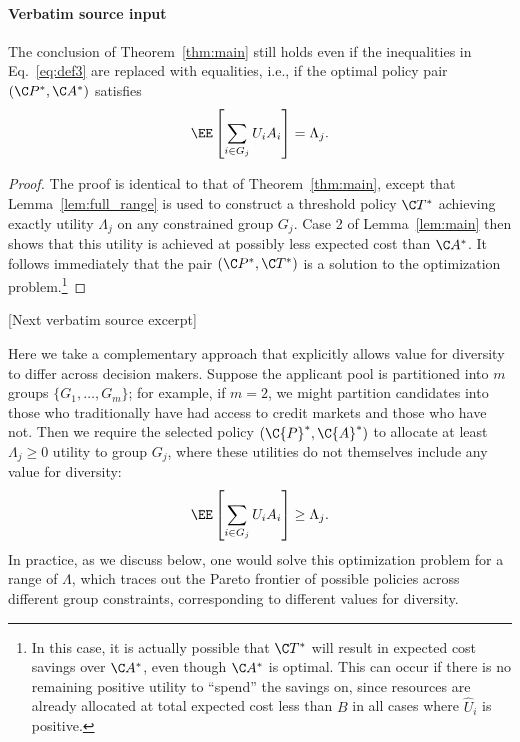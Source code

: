 \documentclass[10pt]{article}
\begin{document}
\paragraph{Verbatim source input}
\begin{ReviewVerbatim}
\begin{lem}
\label{lem:modest_gen}
    The conclusion of Theorem~\ref{thm:main} still holds even if the inequalities in Eq.~\eqref{eq:def3} are replaced with equalities, i.e., if the optimal policy pair \((\C P^*, \C A^*)\) satisfies
        \begin{equation}
            \EE \left[ \sum_{i \in G_j} U_i A_i \right] = \Lambda_j.
        \end{equation}
\end{lem}

\begin{proof}
    The proof is identical to that of Theorem~\ref{thm:main}, except that Lemma~\ref{lem:full_range} is used to construct a threshold policy \(\C T^*\) achieving exactly utility \(\Lambda_j\) on any constrained group \(G_j\).
    Case 2 of Lemma~\ref{lem:main} then shows that this utility is achieved at possibly less expected cost than \(\C A^*\).
    It follows immediately that the pair \((\C P^*, \C T^*)\) is a solution to the optimization problem.\footnote{
        In this case, it is actually possible that \(\C T^*\) will result in expected cost savings over \(\C A^*\), even though \(\C A^*\) is optimal. This can occur if there is no remaining positive utility to ``spend'' the savings on, since resources are already allocated at total expected cost less than \(B\) in all cases where \(\hat U_i\) is positive.
    }
\end{proof}

[Next verbatim source excerpt]

Here we take a complementary approach that explicitly allows value for diversity to differ across decision makers.
Suppose the applicant pool is partitioned into \(m\) groups \(\{G_1, \ldots, G_m\}\);
for example, if \(m = 2\), we might partition candidates into those who traditionally have had access to credit markets and those who have not.
Then we require the selected policy \((\C{P}^*, \C{A}^*)\)
to allocate at least \(\Lambda_j \geq 0\) utility to group \(G_j\), where these utilities do not themselves include any value for diversity:
    \begin{equation}
    \label{eq:def3}
        \EE \left[ \sum_{i \in G_j} U_i A_i \right] \geq \Lambda_j.
    \end{equation}
In practice, as we discuss below, one would solve this optimization problem for a range of \(\Lambda\), which traces out the Pareto frontier of possible policies across different group constraints, corresponding to different values for diversity.


\end{ReviewVerbatim}
\end{document}
